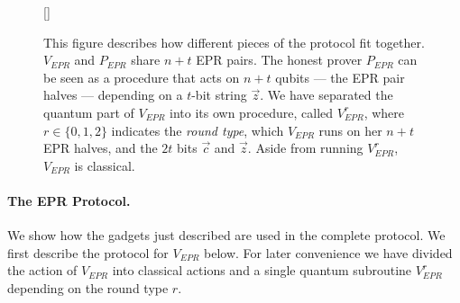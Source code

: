 \documentclass[11pt]{article}
\begin{document}
\begin{figure}[t]
[\FBwidth]
{
  
}
{\caption{This figure describes how different pieces of the protocol fit together. $V_{EPR}$ and $P_{EPR}$ share $n+t$ EPR pairs. The honest prover $P_{EPR}$ can be seen as a procedure that acts on $n+t$ qubits --- the EPR pair halves --- depending on a $t$-bit string $\vec{z}$.  We have separated the quantum part of $V_{EPR}$ into its own procedure, called $V_{EPR}^{r}$, where $r\in\{0,1,2\}$ indicates the \emph{round type}, which $V_{EPR}$ runs on her $n+t$ EPR halves, and the $2t$ bits $\vec{c}$ and $\vec{z}$. Aside from running $V_{EPR}^r$, $V_{EPR}$ is classical. }\label{fig:EPR-high-level}}
\end{figure}



\paragraph{The EPR Protocol.} We show how the gadgets just described are used in the complete protocol. We first describe the protocol for $V_{EPR}$ below.  For later convenience we have divided the action of $V_{EPR}$ into classical actions and a single quantum subroutine $V_{EPR}^r$ depending on the round type $r$. 
\end{document}
